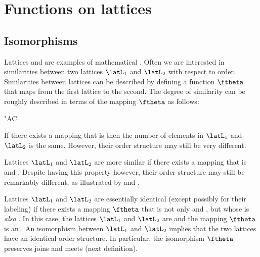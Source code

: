 %
\section{Functions on lattices}
\subsection{Isomorphisms}
Lattices and  
are examples of mathematical .
Often we are interested in similarities between two lattices $\latL_1$ and $\latL_2$ 
with respect to order.
Similarities between lattices can be described by defining a function $\ftheta$ that maps 
from the first lattice to the second.
The degree of similarity can be roughly described in terms of the mapping $\ftheta$ as follows:
\begin{dingautolist}{"AC}
  \item If there exists a mapping that is 
        then the number of elements in $\latL_1$ and $\latL_2$ is the same. 
        However, their order structure may still be very different.
  \item Lattices $\latL_1$ and $\latL_2$ are more similar 
        if there exists a mapping that is  and 
         .
        Despite having this property however, 
        their order structure may still be remarkably different,
        as illustrated by  and .
  \item Lattices $\latL_1$ and $\latL_2$ are essentially identical 
        (except possibly for their labeling) 
        if there exists a mapping $\ftheta$ that is not only 
         and ,
        but whose  
        is \emph{also}  .
        In this case, the lattices $\latL_1$ and $\latL_2$ are 
        and the mapping $\ftheta$ is an .
        An isomorphism between $\latL_1$ and $\latL_2$ implies that the two lattices
        have an identical order structure. In particular,
        the isomorphism $\ftheta$ preserves joins and meets (next definition).
\end{dingautolist}

